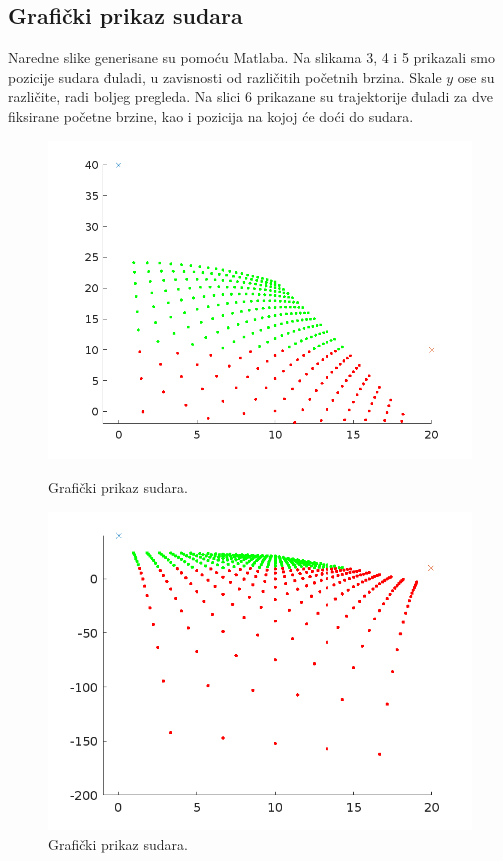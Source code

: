 \documentclass{article}
\begin{document}
\subsection{\huge Grafički prikaz sudara}\label{sec:sudargraf}
Naredne slike generisane su pomoću Matlaba. Na slikama 3, 4 i 5 prikazali smo pozicije sudara đuladi, u zavisnosti od različitih početnih brzina. Skale $y$ ose su različite, radi boljeg pregleda.
\newline
Na slici 6 prikazane su trajektorije đuladi za dve fiksirane početne brzine, kao i pozicija na kojoj će doći do sudara.
\begin{figure}[h]
  \centering
  \begin{minipage}[b]{0.45\linewidth}
    \centering
    \includegraphics[width=\linewidth]{slika2_omm.png}
    \caption{Grafički prikaz sudara.}
    \label{fig:image3}
  \end{minipage}
  \hspace{0.5cm}
  \begin{minipage}[b]{0.45\linewidth}
    \centering
    \includegraphics[width=\linewidth]{slika3_omm.png}
    \caption{Grafički prikaz sudara.}
    \label{fig:image4}
  \end{minipage}
  \label{fig:my_images1}
\end{figure}
\end{document}
